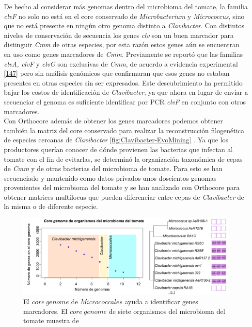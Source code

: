 \documentclass[12pt,twoside]{reedthesis}
\begin{document}
  De hecho al considerar más genomas dentro del microbioma del tomate, la
  familia \emph{clvF} no solo no está en el core conservado de
  \emph{Microbacterium} y \emph{Micrococcus}, sino que no está presente en
  ningún otro genoma distinto a \emph{Clavibacter}. Con distintos niveles
  de conservación de secuencia los genes \emph{clv} son un buen marcador
  para distinguir \emph{Cmm} de otras especies, por esta razón estos genes
  aún se encuentran en uso como genes marcadores de \emph{Cmm}.
  Previamente se reportó que las familias \emph{clvA, clvF} y \emph{clvG}
  son exclusivas de \emph{Cmm}, de acuerdo a evidencia experimental
  {[}\protect\hyperlink{ref-yasuhara-bell_genes_2014}{147}{]} pero sin
  análisis genómicos que confirmaran que esos genes no estaban presentes
  en otras especies sin ser expresados. Este descubrimiento ha permitido
  bajar los costos de identificación de \emph{Clavibacter}, ya que ahora
  en lugar de enviar a secuenciar el genoma es suficiente identificar por
  PCR \emph{clvF} en conjunto con otros marcadores.\\
  Con Orthocore además de obtener los genes marcadores podemos obtener
  también la matriz del core conservado para realizar la reconstrucción
  filogenética de especies cercanas de \emph{Clavibacter}
  \autoref{fig:Clavibacter-EvoMining} . Ya que los productores querían
  conocer de dónde provienen las bacterias que infectan al tomate con el
  fin de evitarlas, se determinó la organización taxonómica de cepas de
  \emph{Cmm} y de otras bacterias del microbioma de tomate. Para esto se
  han secuenciado y mantenido como datos privados unos doscientos genomas
  provenientes del microbioma del tomate y se han analizado con Orthocore
  para obtener matrices multilocus que pueden diferenciar entre cepas de
  \emph{Clavibacter} de la misma o de diferente especie.
  
  \begin{figure}[h!tbp]
  \centering
  \includegraphics[angle = 0,scale = .7]{chapter1/CoreGenomeMicrobioma.pdf}
  \caption[El $core~genome$ de $Micrococcales$ ayuda a identificar genes marcadores ]{\footnotesize{El $core~genome$ de $Micrococcales$ ayuda a identificar genes marcadores. El $core~genome$ de siete organismos del microbioma del tomate muestra  de }}
  \label{fig:Clavibacter-EvoMining}
  \end{figure}
  
\end{document}
